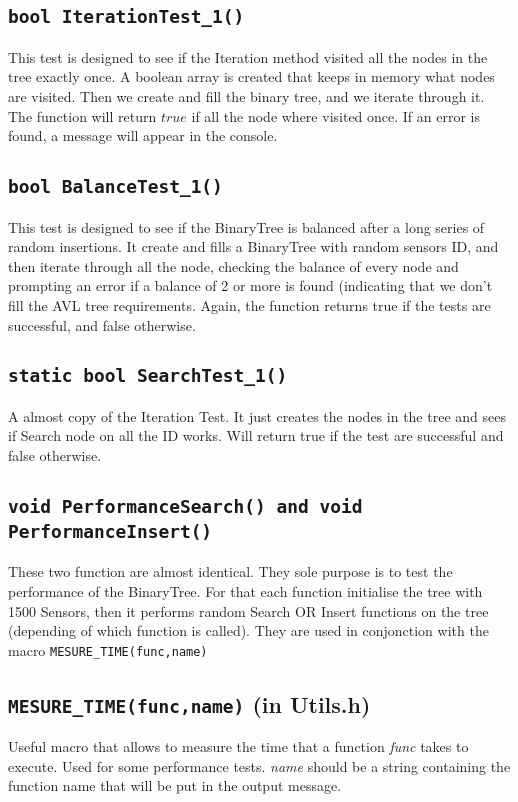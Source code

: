\documentclass[10pt]{article}
\begin{document}
\subsection{\tt bool IterationTest\_1()}
This test is designed to see if the Iteration method visited all the nodes in the tree exactly once. A boolean array is created that keeps in memory what nodes are visited. Then we create and fill the binary tree, and we iterate through it. The function will return $true$ if all the node where visited once. If an error is found, a message will appear in the console.

\subsection{\tt bool BalanceTest\_1()}
This test is designed to see if the BinaryTree is balanced after a long series of random insertions. It create and fills a BinaryTree with random sensors ID, and then iterate through all the node, checking the balance of every node and prompting an error if a balance of 2 or more is found (indicating that we don't fill the AVL tree requirements. Again, the function returns true if the tests are successful, and false otherwise.

\subsection{\tt static bool SearchTest\_1()}
A almost copy of the Iteration Test. It just creates the nodes in the tree and sees if Search node on all the ID works. Will return true if the test are successful and false otherwise.

\subsection{\tt void PerformanceSearch() and void PerformanceInsert()}
These two function are almost identical. They sole purpose is to test the performance of the BinaryTree. For that each function initialise the tree with 1500 Sensors, then it performs random Search OR Insert functions on the tree (depending of which function is called). They are used in conjonction with the macro \texttt{MESURE\_TIME(func,name)}

\subsection{\texttt{MESURE\_TIME(func,name)} (in Utils.h)}
Useful macro that allows to measure the time that a function \emph{func} takes to execute. Used for some performance tests. \emph{name} should be a string containing the function name that will be put in the output message.
\end{document}
